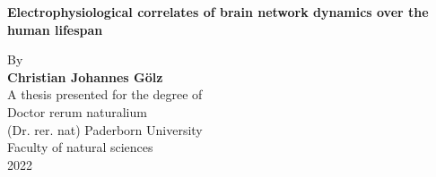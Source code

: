 \begin{titlepage}
    \begin{center}
        \vspace*{1cm}
        \Huge
        \textbf{Electrophysiological correlates of brain network dynamics over the human lifespan}
                        
        \vspace{1.5cm}
        \LARGE
        By\\
        \vspace{0.5cm}
        \textbf{Christian Johannes Gölz\\}
        \vspace{0.5cm}       
        A thesis presented for the degree of\\
        Doctor rerum naturalium\\
        (Dr. rer. nat)
        \vfill
        \Large
        Paderborn University\\
        Faculty of natural sciences\\
        2022
            
    \end{center}
\end{titlepage}

